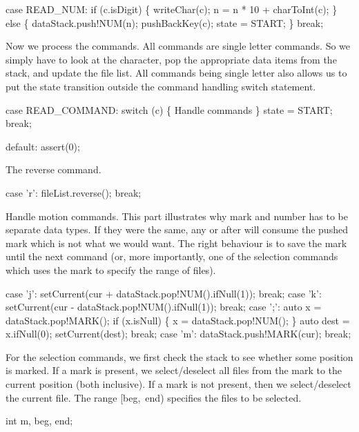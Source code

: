case READ_NUM:
  if (c.isDigit) \{
    writeChar(c);
    n = n * 10 + charToInt(c);
  \} else \{
    dataStack.push!NUM(n);
    pushBackKey(c);
    state = START;
  \}
  break;

\nwendcode{}Now we process the commands. All commands are single letter
commands. So we simply have to look at the character, pop the
appropriate data items from the stack, and update the file list. All
commands being single letter also allows us to put the state
transition outside the command handling {\Tt{}switch\nwendquote} statement.

\nwenddocs{}\endmoddef\nwstartdeflinemarkup\nwenddeflinemarkup
case READ_COMMAND:
  switch (c) \{
    \LA{}Handle commands\RA{}
  \}
  state = START;
  break;

default: assert(0);

\nwendcode{}The reverse command.

\nwenddocs{}\endmoddef\nwstartdeflinemarkup\nwenddeflinemarkup
case 'r':
  fileList.reverse(); break;

\nwendcode{}Handle motion commands. This part illustrates why mark and number
has to be separate data types. If they were the same, any  or
 after  will consume the pushed mark which is not what
we would want. The right behaviour is to save the mark until the next
\unix{;} command (or, more importantly, one of the selection commands
which uses the mark to specify the range of files).

\nwenddocs{}\plusendmoddef\nwstartdeflinemarkup\nwenddeflinemarkup
case 'j':
  setCurrent(cur + dataStack.pop!NUM().ifNull(1));
  break;
case 'k':
  setCurrent(cur - dataStack.pop!NUM().ifNull(1));
  break;
case ';':
  auto x = dataStack.pop!MARK();
  if (x.isNull) \{
    x = dataStack.pop!NUM();
  \}
  auto dest = x.ifNull(0);
  setCurrent(dest);
  break;
case 'm':
  dataStack.push!MARK(cur);
  break;

\nwendcode{}For the selection commands, we first check the stack to see whether
some position is marked. If a mark is present, we select/deselect all
files from the mark to the current position (both inclusive). If a
mark is not present, then we select/deselect the current file. The
range {\Tt{}[beg,\ end)\nwendquote} specifies the files to be selected.

\nwenddocs{}\plusendmoddef\nwstartdeflinemarkup\nwenddeflinemarkup
int m, beg, end;

